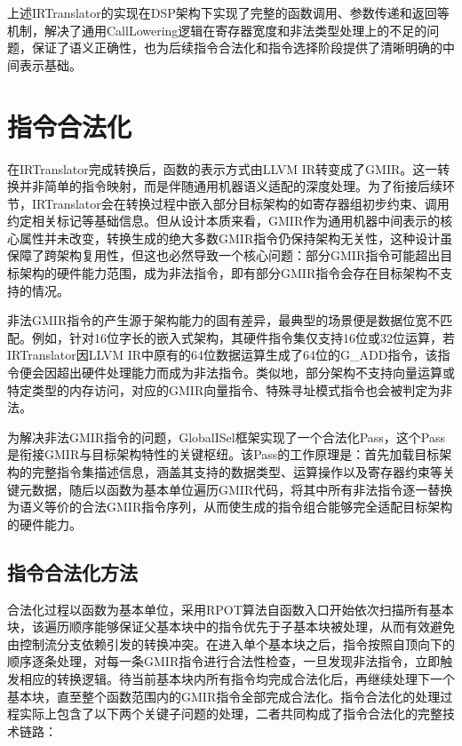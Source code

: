 上述IRTranslator的实现在DSP架构下实现了完整的函数调用、参数传递和返回等机制，解决了通用CallLowering逻辑在寄存器宽度和非法类型处理上的不足的问题，保证了语义正确性，也为后续指令合法化和指令选择阶段提供了清晰明确的中间表示基础。


\section{指令合法化}
在IRTranslator完成转换后，函数的表示方式由LLVM IR转变成了GMIR。这一转换并非简单的指令映射，而是伴随通用机器语义适配的深度处理。为了衔接后续环节，IRTranslator会在转换过程中嵌入部分目标架构的如寄存器组初步约束、调用约定相关标记等基础信息。但从设计本质来看，GMIR作为通用机器中间表示的核心属性并未改变，转换生成的绝大多数GMIR指令仍保持架构无关性，这种设计虽保障了跨架构复用性，但这也必然导致一个核心问题：部分GMIR指令可能超出目标架构的硬件能力范围，成为非法指令，即有部分GMIR指令会存在目标架构不支持的情况。

\par

非法GMIR指令的产生源于架构能力的固有差异，最典型的场景便是数据位宽不匹配。例如，针对16位字长的嵌入式架构，其硬件指令集仅支持16位或32位运算，若IRTranslator因LLVM IR中原有的64位数据运算生成了64位的G\_ADD指令，该指令便会因超出硬件处理能力而成为非法指令。类似地，部分架构不支持向量运算或特定类型的内存访问，对应的GMIR向量指令、特殊寻址模式指令也会被判定为非法。

\par

为解决非法GMIR指令的问题，GlobalISel框架实现了一个合法化Pass，这个Pass是衔接GMIR与目标架构特性的关键枢纽。该Pass的工作原理是：首先加载目标架构的完整指令集描述信息，涵盖其支持的数据类型、运算操作以及寄存器约束等关键元数据，随后以函数为基本单位遍历GMIR代码，将其中所有非法指令逐一替换为语义等价的合法GMIR指令序列，从而使生成的指令组合能够完全适配目标架构的硬件能力。


\subsection{指令合法化方法}
合法化过程以函数为基本单位，采用RPOT算法自函数入口开始依次扫描所有基本块，该遍历顺序能够保证父基本块中的指令优先于子基本块被处理，从而有效避免由控制流分支依赖引发的转换冲突。在进入单个基本块之后，指令按照自顶向下的顺序逐条处理，对每一条GMIR指令进行合法性检查，一旦发现非法指令，立即触发相应的转换逻辑。待当前基本块内所有指令均完成合法化后，再继续处理下一个基本块，直至整个函数范围内的GMIR指令全部完成合法化。指令合法化的处理过程实际上包含了以下两个关键子问题的处理，二者共同构成了指令合法化的完整技术链路：

